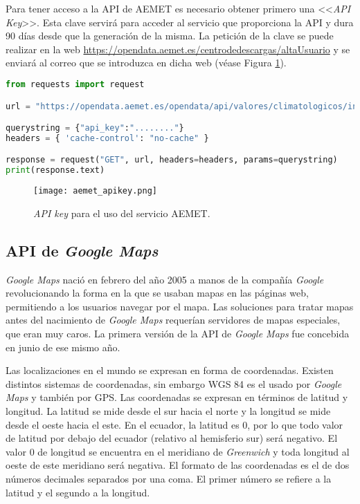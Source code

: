 Para tener acceso a la \ac{API} de \ac{AEMET} es necesario obtener primero una <<\textit{\ac{API} Key}>>. Esta clave servirá para acceder al servicio que proporciona la \ac{API} y dura 90 días desde que la generación de la misma. La petición de la clave se puede realizar en la web \url{https://opendata.aemet.es/centrodedescargas/altaUsuario} y se enviará al correo que se introduzca en dicha web (véase Figura \ref{fig:aemet_apikey}). \\

\begin{lstlisting}[language=python,captionpos=t,caption={\textbf{Inventario con todas las características de todas las estaciones climatológicas.}},label={lst:aemetcode}]
from requests import request

url = "https://opendata.aemet.es/opendata/api/valores/climatologicos/inventarioestaciones/todasestaciones/"

querystring = {"api_key":"........"}
headers = { 'cache-control': "no-cache" }

response = request("GET", url, headers=headers, params=querystring)
print(response.text)
\end{lstlisting}

\begin{figure}[!h]
\begin{center}
\texttt{[image: aemet\_apikey.png]}
\caption{\textit{\ac{API} key} para el uso del servicio \ac{AEMET}.}
\label{fig:aemet_apikey}
\end{center}
\end{figure}

\subsection{\ac{API} de \textit{Google Maps}}
\label{apiGoogleMaps}
\textit{Google Maps} nació en febrero del año 2005 a manos de la compañía \textit{Google} \cite{40} revolucionando la forma en la que se usaban mapas en las páginas web, permitiendo a los usuarios navegar por el mapa. Las soluciones para tratar mapas antes del nacimiento de \textit{Google Maps} requerían servidores de mapas especiales, que eran muy caros. La primera versión de la \ac{API} de \textit{Google Maps} fue concebida en junio de ese mismo año.

Las localizaciones en el mundo se expresan en forma de coordenadas. Existen distintos sistemas de coordenadas, sin embargo \ac{WGS 84} es el usado por \textit{Google Maps} y también por \ac{GPS}. Las coordenadas se expresan en términos de latitud y longitud. La latitud se mide desde el sur hacia el norte y la longitud se mide desde el oeste hacia el este. En el ecuador, la latitud es 0, por lo que todo valor de latitud por debajo del ecuador (relativo al hemisferio sur) será negativo. El valor 0 de longitud se encuentra en el meridiano de \textit{Greenwich} y toda longitud al oeste de este meridiano será negativa. El formato de las coordenadas es el de dos números decimales separados por una coma. El primer número se refiere a la latitud y el segundo a la longitud.

